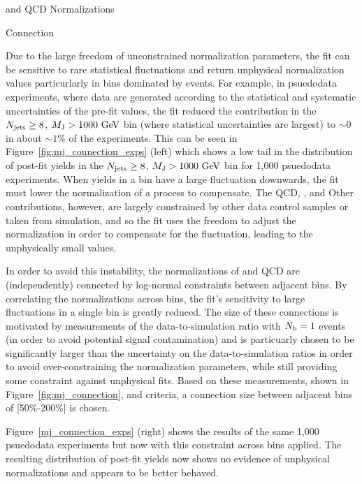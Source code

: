 \begin{section}{\ttbar and QCD Normalizations}
\begin{subsection}{\MJ Connection}
\label{subsec:mj_connection}

Due to the large freedom of unconstrained normalization parameters, the fit can be sensitive to rare statistical fluctuations and return unphysical normalization values particurlarly in bins dominated by \ttbar events.
For example, in psuedodata experiments, where data are generated according to the statistical and systematic uncertainties of the pre-fit values, the fit reduced the \ttbar contribution in the $N_{\mathrm{jets}} \geq 8$, $M_{\mathrm{J}} > 1000~\mathrm{Ge\kern -0.1em V}$ bin (where statistical uncertainties are largest) to $\sim 0$ in about $\sim 1\%$ of the experiments.
This can be seen in Figure~\ref{fig:mj_connection_exps} (left) which shows a low tail in the distribution of post-fit \ttbar yields in the $N_{\mathrm{jets}} \geq 8$, $M_{\mathrm{J}} > 1000~\mathrm{Ge\kern -0.1em V}$ bin for 1,000 psuedodata experiments.
When yields in a bin have a large fluctuation downwards, the fit must lower the normalization of a process to compensate.
The QCD, \Wjets, and Other contributions, however, are largely constrained by other data control samples or taken from simulation, and so the fit uses the freedom to adjust the \ttbar normalization in order to compensate for the fluctuation, leading to the unphysically small values.

In order to avoid this instability, the normalizations of \ttbar and QCD are (independently) connected by log-normal constraints between adjacent \MJ bins.
By correlating the normalizations across \MJ bins, the fit's sensitivity to large fluctuations in a single bin is greatly reduced.
The size of these connections is motivated by measurements of the data-to-simulation ratio with $N_{\mathrm{b}} = 1$ events (in order to avoid potential signal contamination) and is particuarly chosen to be significantly larger than the uncertainty on the data-to-simulation ratios in order to avoid over-constraining the normalization parameters, while still providing some constraint against unphysical fits.
Based on these measurements, shown in Figure~\ref{fig:mj_connection}, and criteria, a connection size between adjacent bins of [50\%-200\%] is chosen.

Figure~\ref{mj_connection_exps} (right) shows the results of the same 1,000 psuedodata experiments but now with this constraint across \MJ bins applied.
The resulting distribution of post-fit \ttbar yields now shows no evidence of unphysical normalizations and appears to be better behaved.


\end{subsection}
\end{section}
